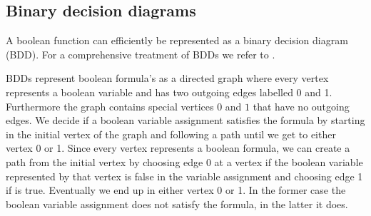 \subsection{Binary decision diagrams}
\label{sec_prelim_bdd}
A boolean function can efficiently be represented as a binary decision diagram (BDD). For a comprehensive treatment of BDDs we refer to \cite{BDD_running_time,Handbook_BDD_Chapter}.

BDDs represent boolean formula's as a directed graph where every vertex represents a boolean variable and has two outgoing edges labelled 0 and 1. Furthermore the graph contains special vertices $0$ and $1$ that have no outgoing edges. We decide if a boolean variable assignment satisfies the formula by starting in the initial vertex of the graph and following a path until we get to either vertex 0 or 1. Since every vertex represents a boolean formula, we can create a path from the initial vertex by choosing edge 0 at a vertex if the boolean variable represented by that vertex is false in the variable assignment and choosing edge 1 if is true. Eventually we end up in either vertex 0 or 1. In the former case the boolean variable assignment does not satisfy the formula, in the latter it does.

